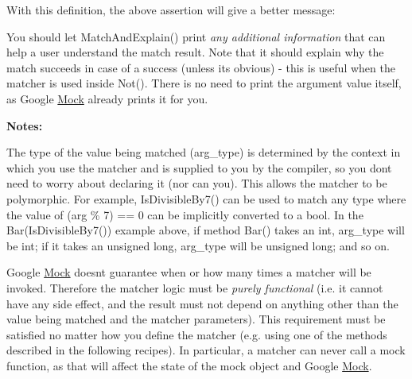 With this definition, the above assertion will give a better message\+: 
\begin{DoxyCode}{0}
\end{DoxyCode}


You should let {\ttfamily Match\+And\+Explain()} print {\itshape any additional information} that can help a user understand the match result. Note that it should explain why the match succeeds in case of a success (unless it\textquotesingle{}s obvious) -\/ this is useful when the matcher is used inside {\ttfamily Not()}. There is no need to print the argument value itself, as Google \mbox{\hyperlink{classMock}{Mock}} already prints it for you.

{\bfseries{Notes\+:}}


\begin{DoxyEnumerate}
\item The type of the value being matched ({\ttfamily arg\+\_\+type}) is determined by the context in which you use the matcher and is supplied to you by the compiler, so you don\textquotesingle{}t need to worry about declaring it (nor can you). This allows the matcher to be polymorphic. For example, {\ttfamily Is\+Divisible\+By7()} can be used to match any type where the value of {\ttfamily (arg \% 7) == 0} can be implicitly converted to a {\ttfamily bool}. In the {\ttfamily Bar(\+Is\+Divisible\+By7())} example above, if method {\ttfamily Bar()} takes an {\ttfamily int}, {\ttfamily arg\+\_\+type} will be {\ttfamily int}; if it takes an {\ttfamily unsigned long}, {\ttfamily arg\+\_\+type} will be {\ttfamily unsigned long}; and so on.
\end{DoxyEnumerate}
\begin{DoxyEnumerate}
\item Google \mbox{\hyperlink{classMock}{Mock}} doesn\textquotesingle{}t guarantee when or how many times a matcher will be invoked. Therefore the matcher logic must be {\itshape purely functional} (i.\+e. it cannot have any side effect, and the result must not depend on anything other than the value being matched and the matcher parameters). This requirement must be satisfied no matter how you define the matcher (e.\+g. using one of the methods described in the following recipes). In particular, a matcher can never call a mock function, as that will affect the state of the mock object and Google \mbox{\hyperlink{classMock}{Mock}}.
\end{DoxyEnumerate}

